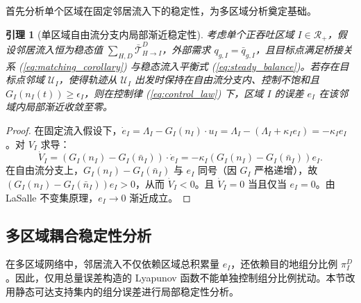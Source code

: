 \documentclass[a4paper,12pt]{article}
\theoremstyle{plain}
\newtheorem{lemma}[theorem]{引理}
\theoremstyle{definition}
\theoremstyle{remark}
\begin{document}
首先分析单个区域在固定邻居流入下的稳定性，为多区域分析奠定基础。

\begin{lemma}[单区域自由流分支内局部渐近稳定性]\label{lem:single_region}
考虑单个正吞吐区域 $I\in\mathcal R_+$，假设邻居流入恒为稳态值 $\sum_{H,D} \bar{\mathcal{T}}_{H \to I}^D$，外部需求 $q_{g,I} = \bar{q}_{g,I}$，且目标点满足桥接关系 (\ref{eq:matching_corollary}) 与稳态流入平衡式 (\ref{eq:steady_balance})。若存在目标点邻域 $\mathcal U_I$，使得轨迹从 $\mathcal U_I$ 出发时保持在自由流分支内、控制不饱和且 $G_I(n_I(t))\ge\epsilon_I$，则在控制律 (\ref{eq:control_law}) 下，区域 $I$ 的误差 $e_I$ 在该邻域内局部渐近收敛至零。
\end{lemma}

\begin{proof}
在固定流入假设下，$\dot{e}_I = \Lambda_I - G_I(n_I) \cdot u_I = \Lambda_I - (\Lambda_I + \kappa_I e_I) = -\kappa_I e_I$。对 $V_I$ 求导：
\begin{equation}
    \dot{V}_I = (G_I(n_I) - G_I(\bar{n}_I)) \cdot \dot{e}_I
    =
    -\kappa_I\left(G_I(n_I)-G_I(\bar n_I)\right)e_I .
\end{equation}
在自由流分支上，$G_I(n_I)-G_I(\bar n_I)$ 与 $e_I$ 同号（因 $G_I$ 严格递增），故 $\left(G_I(n_I)-G_I(\bar n_I)\right)e_I>0$，从而 $\dot{V}_I<0$。且 $\dot{V}_I = 0$ 当且仅当 $e_I = 0$。由 LaSalle 不变集原理，$e_I \to 0$ 渐近成立。
\end{proof}

\subsection{多区域耦合稳定性分析}

在多区域网络中，邻居流入不仅依赖区域总积累量 $e_I$，还依赖目的地组分比例 $\pi_I^D$。因此，仅用总量误差构造的 Lyapunov 函数不能单独控制组分比例扰动。本节改用静态可达支持集内的组分误差进行局部稳定性分析。
\end{document}
